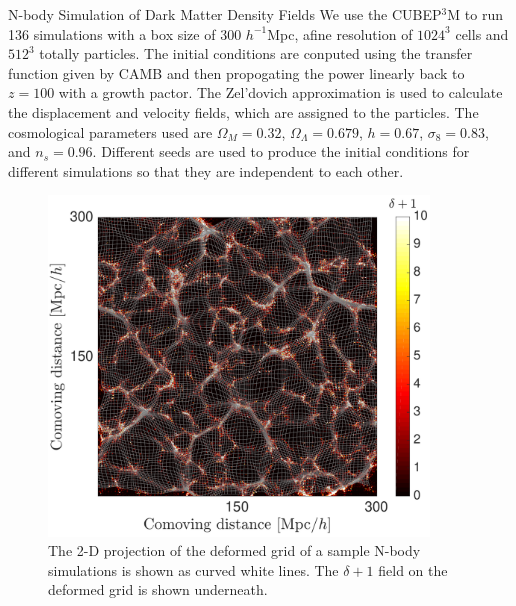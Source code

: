 \begin{section}{N-body Simulation of Dark Matter Density Fields}
  \label{sec:simulation}
    We use the \textsc{CUBEP$^3$M} \cite{bib:Harnois2013} to 
run 136 simulations with a box size of 300 $h^{-1}$Mpc, 
afine resolution of $1024^3$ cells and $512^3$ totally particles. The initial conditions are 
conputed using the transfer function given by CAMB \cite{bib:Lewis2000} 
and then propogating the power linearly back to $z=100$ with a growth pactor. The Zel'dovich approximation 
is used to calculate the displacement and velocity fields, which are 
assigned to the particles. The cosmological parameters used are $\Omega_M=0.32$, 
$\Omega_{\Lambda}=0.679$, $h=0.67$, $\sigma_8=0.83$, and $n_s=0.96$. Different seeds are used to produce 
the initial conditions for different simulations so that they are 
independent to each other.
\begin{figure}[t!]
\centering
 \includegraphics[width=0.9\textwidth]{sar_best_analysis-crop.pdf}
   \caption{
The 2-D projection of the 
deformed grid of a sample N-body simulations is shown as curved white lines. The $\delta+1$ field 
on the deformed grid is shown underneath.}
 \label{fig:simandrec}
\end{figure}

\end{section}

